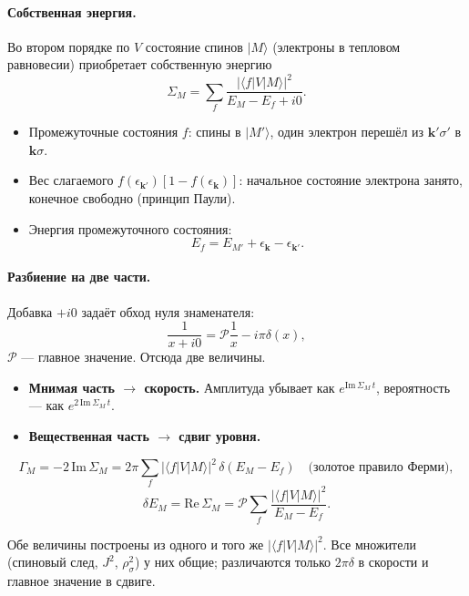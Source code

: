 \paragraph{Собственная энергия.} Во втором порядке по $V$ состояние спинов
$|M\rangle$ (электроны в тепловом равновесии) приобретает собственную энергию
\begin{equation}
\Sigma_M=\sum_{f}\frac{|\langle f|V|M\rangle|^2}{E_M-E_f+i0}.
\label{eq:kd_sigma}
\end{equation}
\begin{itemize}
\item Промежуточные состояния $f$: спины в $|M'\rangle$, один электрон перешёл
  из $\mathbf k'\sigma'$ в $\mathbf k\sigma$.
\item Вес слагаемого $f(\epsilon_{\mathbf k'})[1-f(\epsilon_{\mathbf k})]$: начальное
  состояние электрона занято, конечное свободно (принцип Паули).
\item Энергия промежуточного состояния:
  \[
  E_f=E_{M'}+\epsilon_{\mathbf k}-\epsilon_{\mathbf k'} .
  \]
\end{itemize}

\paragraph{Разбиение на две части.} Добавка $+i0$ задаёт обход нуля знаменателя:
\[
\frac{1}{x+i0}=\mathcal P\frac1x-i\pi\delta(x),
\]
$\mathcal P$ --- главное значение. Отсюда две величины.
\begin{itemize}
\item \textbf{Мнимая часть $\to$ скорость.} Амплитуда убывает как
  $e^{\mathrm{Im}\,\Sigma_M\,t}$, вероятность --- как $e^{2\,\mathrm{Im}\,\Sigma_M\,t}$.
\item \textbf{Вещественная часть $\to$ сдвиг уровня.}
\end{itemize}
\begin{resbox}
\[
\Gamma_M=-2\,\mathrm{Im}\,\Sigma_M=2\pi\sum_f|\langle f|V|M\rangle|^2\,\delta(E_M-E_f)
\quad\text{(золотое правило Ферми)},
\]
\[
\delta E_M=\mathrm{Re}\,\Sigma_M=\mathcal P\sum_f\frac{|\langle f|V|M\rangle|^2}{E_M-E_f}.
\]
\end{resbox}
Обе величины построены из одного и того же $|\langle f|V|M\rangle|^2$. Все
множители (спиновый след, $J^2$, $\rho_\sigma^2$) у них общие; различаются только
$2\pi\delta$ в скорости и главное значение в сдвиге.

